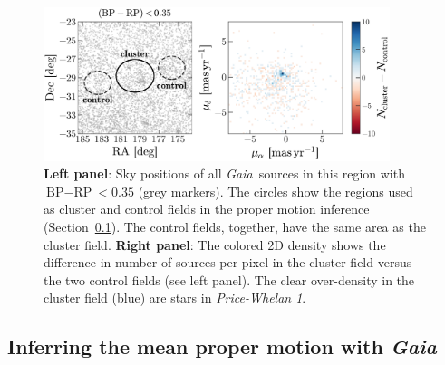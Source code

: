 \documentclass[twocolumn]{aastex62}
\newcommand{\gaia}{\textsl{Gaia}}
\newcommand{\sectionname}{Section}
\newcommand{\clustername}{\textsl{Price-Whelan 1}}
\newcommand{\bprp}{\ensuremath{\textrm{BP} - \textrm{RP}}}
\begin{document}
\begin{figure}[t!]
\centering
\includegraphics[width=0.9\textwidth]{figures/pm-model.pdf}
\caption{\textbf{Left panel}: Sky positions of all \gaia\ sources in this region with $\bprp < 0.35$ (grey markers).
The circles show the regions used as cluster and control fields in the proper motion inference (\sectionname~\ref{sec:pmclean}).
The control fields, together, have the same area as the cluster field.
\textbf{Right panel}: The colored 2D density shows the difference in number of sources per pixel in the cluster field versus the two control fields (see left panel).
The clear over-density in the cluster field (blue) are stars in \clustername.}
\label{fig:pm-members}
\end{figure}

\subsection{Inferring the mean proper motion with \gaia}
\label{sec:pmclean}
\end{document}
